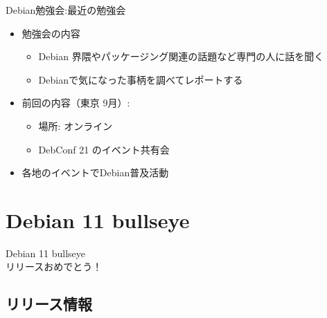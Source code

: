 \begin{frame}{Debian勉強会:最近の勉強会}
  
\begin{itemize}
\item 勉強会の内容
  \begin{itemize}
  \item Debian 界隈やパッケージング関連の話題など専門の人に話を聞く
  \item Debianで気になった事柄を調べてレポートする
  \end{itemize}
\item 前回の内容（東京 9月）:
  \begin{itemize}
  \item 場所: オンライン
  \item DebConf 21 のイベント共有会
  \end{itemize}
\item 各地のイベントでDebian普及活動
\end{itemize}

\end{frame}


\section{Debian 11 bullseye}

\begin{frame}
  \begin{center}\Huge{Debian 11 bullseye\\リリースおめでとう！}\end{center}
\end{frame}

\subsection{リリース情報}

